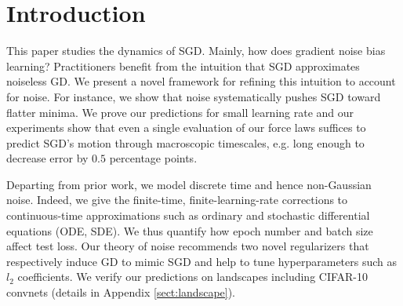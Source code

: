 \documentclass{article}
\theoremstyle{plain}
\theoremstyle{definition}
\begin{document}

\section{Introduction}



    This paper studies the dynamics of SGD.  Mainly, how does gradient noise
    bias learning?
    Practitioners benefit from the intuition that SGD approximates noiseless
    GD.  We present a novel framework for refining this intuition to account
    for noise.  For instance, we show that noise systematically pushes SGD
    toward flatter minima.  We prove our predictions for small learning rate
    and our experiments show that even a single evaluation of our force laws
    suffices to predict SGD's motion through macroscopic timescales, e.g. long
    enough to decrease error by $0.5$ percentage points.
    


    Departing from prior work, we model discrete time and hence non-Gaussian
    noise.  Indeed, we give the finite-time, finite-learning-rate corrections
    to continuous-time approximations such as ordinary and stochastic
    differential equations (ODE, SDE).  
    We thus quantify how epoch number and batch size affect test loss.
    Our theory of noise recommends two novel regularizers that respectively
    induce GD to mimic SGD and help to tune hyperparameters such as $l_2$
    coefficients.
    We verify our predictions on landscapes including CIFAR-10 convnets
    (details in Appendix \ref{sect:landscape}).
\end{document}
